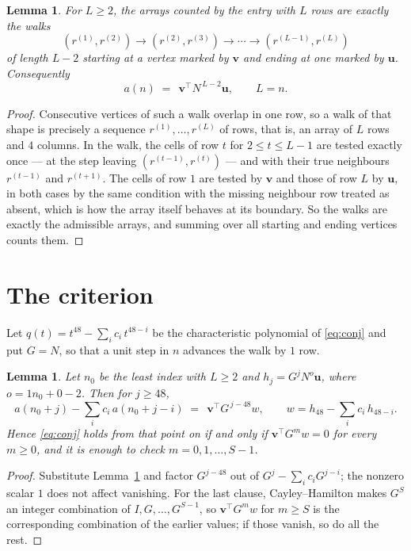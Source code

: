 \documentclass[11pt,a4paper]{article}
\theoremstyle{plain}
\newtheorem{lemma}[theorem]{Lemma}
\theoremstyle{definition}
\begin{document}
\begin{lemma}\label{lem:walk}
For $L\ge2$, the arrays counted by the entry with $L$ rows are exactly the walks
\[
(r^{(1)},r^{(2)})\to(r^{(2)},r^{(3)})\to\cdots\to(r^{(L-1)},r^{(L)})
\]
of length $L-2$ starting at a vertex marked by $\mathbf{v}$ and ending at one marked by
$\mathbf{u}$. Consequently
\[
a(n)\;=\;\,\mathbf{v}^{\!\top}N^{\,L-2}\mathbf{u},\qquad L=n .
\]
\end{lemma}

\begin{proof}
Consecutive vertices of such a walk overlap in one row, so a walk of that shape is
precisely a sequence $r^{(1)},\dots,r^{(L)}$ of rows, that is, an array of $L$ rows
and $4$ columns. In the walk, the cells of row $t$ for $2\le t\le L-1$ are tested
exactly once --- at the step leaving $(r^{(t-1)},r^{(t)})$ --- and with their true
neighbours $r^{(t-1)}$ and $r^{(t+1)}$. The cells of row $1$ are tested by
$\mathbf{v}$ and those of row $L$ by $\mathbf{u}$, in both cases by the same condition
with the missing neighbour row treated as absent, which is how the array itself behaves at
its boundary. So the walks are exactly the admissible arrays, and summing over all starting
and ending vertices counts them.
\end{proof}

\section{The criterion}

Let $q(t)=t^{48}-\sum_i c_i\,t^{48-i}$ be the characteristic polynomial of
\eqref{eq:conj} and put $G=N$, so that a unit step in $n$ advances the walk by
$1$ row.

\begin{lemma}\label{lem:crit}
Let $n_0$ be the least index with $L\ge2$ and $h_j=G^{j}N^{o}\mathbf{u}$, where
$o=1n_0+0-2$. Then for $j\ge48$,
\[
a(n_0+j)-\sum_i c_i\,a(n_0+j-i)\;=\;\,\mathbf{v}^{\!\top}G^{\,j-48}w,
\qquad w=h_{48}-\sum_i c_i\,h_{48-i} .
\]
Hence \eqref{eq:conj} holds from that point on if and only if
$\mathbf{v}^{\!\top}G^{m}w=0$ for every $m\ge0$, and it is enough to check
$m=0,1,\dots,S-1$.
\end{lemma}

\begin{proof}
Substitute Lemma~\ref{lem:walk} and factor $G^{j-48}$ out of
$G^{j}-\sum_ic_iG^{j-i}$; the nonzero scalar $1$ does not affect
vanishing. For the last clause, Cayley--Hamilton makes $G^{S}$ an integer combination of
$I,G,\dots,G^{S-1}$, so $\mathbf{v}^{\!\top}G^{m}w$ for $m\ge S$ is the corresponding
combination of the earlier values; if those vanish, so do all the rest.
\end{proof}
\end{document}
